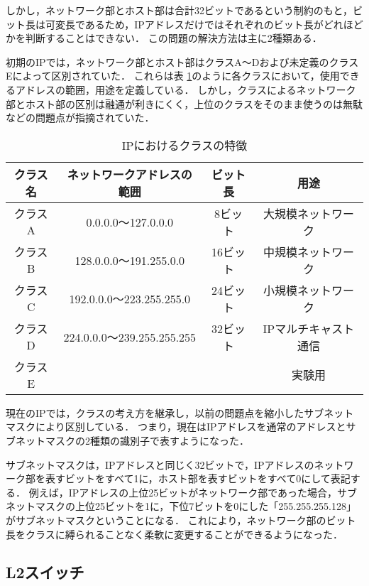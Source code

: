 しかし，ネットワーク部とホスト部は合計32ビットであるという制約のもと，ビット長は可変長であるため，IPアドレスだけではそれぞれのビット長がどれほどかを判断することはできない．
この問題の解決方法は主に2種類ある．

初期のIPでは，ネットワーク部とホスト部はクラスA～Dおよび未定義のクラスEによって区別されていた．
これらは表 \ref{tab:2-3}のように各クラスにおいて，使用できるアドレスの範囲，用途を定義している．
しかし，クラスによるネットワーク部とホスト部の区別は融通が利きにくく，上位のクラスをそのまま使うのは無駄などの問題点が指摘されていた．

\begin{table}[tb]
	\begin{center}
		\caption{IPにおけるクラスの特徴}
		\begin{tabular}{c|c|c|c}
			\hline \hline
			クラス名 & ネットワークアドレスの範囲 & ビット長 & 用途　\\ \hline
			クラスA & 0.0.0.0～127.0.0.0 & 8ビット & 大規模ネットワーク\\
			クラスB & 128.0.0.0～191.255.0.0 & 16ビット & 中規模ネットワーク \\
			クラスC & 192.0.0.0～223.255.255.0 & 24ビット & 小規模ネットワーク \\
			クラスD & 224.0.0.0～239.255.255.255 & 32ビット & IPマルチキャスト通信\\
			クラスE & & & 実験用　\\ \hline
		\end{tabular}
		\label{tab:2-3}
	\end{center}
\end{table}

現在のIPでは，クラスの考え方を継承し，以前の問題点を縮小したサブネットマスクにより区別している．
つまり，現在はIPアドレスを通常のアドレスとサブネットマスクの2種類の識別子で表すようになった．

サブネットマスクは，IPアドレスと同じく32ビットで，IPアドレスのネットワーク部を表すビットをすべて1に，ホスト部を表すビットをすべて0にして表記する．
例えば，IPアドレスの上位25ビットがネットワーク部であった場合，サブネットマスクの上位25ビットを1に，下位7ビットを0にした「255.255.255.128」がサブネットマスクということになる．
これにより，ネットワーク部のビット長をクラスに縛られることなく柔軟に変更することができるようになった．

\subsection{L2スイッチ}

